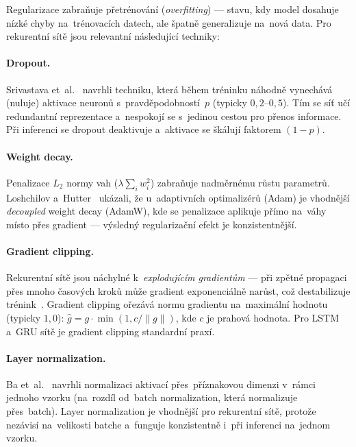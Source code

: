 Regularizace zabraňuje přetrénování (\textit{overfitting}) --- stavu, kdy model dosahuje nízké chyby na~trénovacích datech, ale špatně generalizuje na~nová data. Pro rekurentní sítě jsou relevantní následující techniky:

\paragraph{Dropout.}
Srivastava et~al.~\cite{srivastava2014dropout} navrhli techniku, která během tréninku náhodně vynechává (nuluje) aktivace neuronů s~pravděpodobností~$p$ (typicky $0{,}2$--$0{,}5$). Tím se síť učí redundantní reprezentace a~nespokojí se s~jedinou cestou pro přenos informace. Při inferenci se dropout deaktivuje a~aktivace se škálují faktorem $(1-p)$.

\paragraph{Weight decay.}
Penalizace $L_2$ normy vah ($\lambda \sum_i w_i^2$) zabraňuje nadměrnému růstu parametrů. Loshchilov a~Hutter~\cite{loshchilov2019adamw} ukázali, že u~adaptivních optimalizérů (Adam) je vhodnější \emph{decoupled} weight decay (AdamW), kde se penalizace aplikuje přímo na~váhy místo přes gradient --- výsledný regularizační efekt je konzistentnější.

\paragraph{Gradient clipping.}
Rekurentní sítě jsou náchylné k~\emph{explodujícím gradientům} --- při zpětné propagaci přes mnoho časových kroků může gradient exponenciálně narůst, což destabilizuje trénink~\cite{pascanu2013gradient}. Gradient clipping ořezává normu gradientu na~maximální hodnotu (typicky $1{,}0$): $\hat{g} = g \cdot \min(1, c / \|g\|)$, kde $c$ je prahová hodnota. Pro LSTM a~GRU sítě je gradient clipping standardní praxí.

\paragraph{Layer normalization.}
Ba et~al.~\cite{ba2016layernorm} navrhli normalizaci aktivací přes~příznakovou dimenzi v~rámci jednoho vzorku (na~rozdíl od~batch normalization, která normalizuje přes~batch). Layer normalization je vhodnější pro rekurentní sítě, protože nezávisí na~velikosti batche a~funguje konzistentně i~při inferenci na~jednom vzorku.


